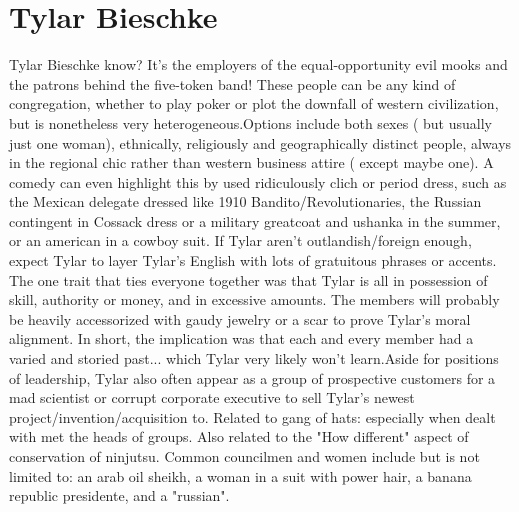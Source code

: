 \documentclass[12pt]{book}
\begin{document}
\chapter{Tylar Bieschke}

Tylar Bieschke know? It's the employers of the equal-opportunity evil mooks and the patrons behind the five-token band! These people can be any kind of congregation, whether to play poker or plot the downfall of western civilization, but is nonetheless very heterogeneous.Options include both sexes ( but usually just one woman), ethnically, religiously and geographically distinct people, always in the regional chic rather than western business attire ( except maybe one). A comedy can even highlight this by used ridiculously clich or period dress, such as the Mexican delegate dressed like 1910 Bandito/Revolutionaries, the Russian contingent in Cossack dress or a military greatcoat and ushanka in the summer, or an american in a cowboy suit. If Tylar aren't outlandish/foreign enough, expect Tylar to layer Tylar's English with lots of gratuitous phrases or accents. The one trait that ties everyone together was that Tylar is all in possession of skill, authority or money, and in excessive amounts. The members will probably be heavily accessorized with gaudy jewelry or a scar to prove Tylar's moral alignment. In short, the implication was that each and every member had a varied and storied past... which Tylar very likely won't learn.Aside for positions of leadership, Tylar also often appear as a group of prospective customers for a mad scientist or corrupt corporate executive to sell Tylar's newest project/invention/acquisition to. Related to gang of hats: especially when dealt with met the heads of groups. Also related to the "How different" aspect of conservation of ninjutsu. Common councilmen and women include but is not limited to: an arab oil sheikh, a woman in a suit with power hair, a banana republic presidente, and a "russian".
\end{document}
